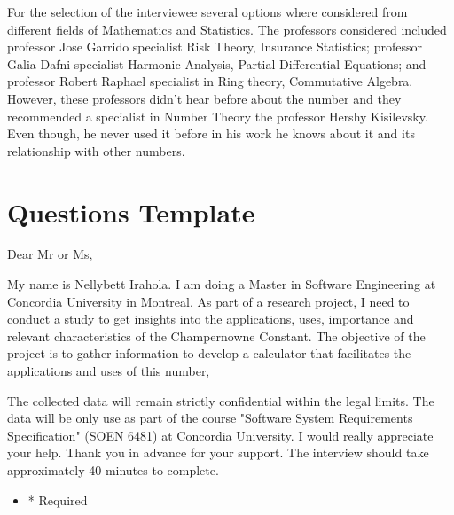 \documentclass{article}
\begin{document}
For the selection of the interviewee several options where considered from different fields of Mathematics and Statistics. The professors considered included professor Jose Garrido specialist Risk Theory, Insurance Statistics; professor Galia Dafni specialist Harmonic Analysis, Partial Differential Equations; and professor Robert Raphael specialist in Ring theory, Commutative Algebra. However, these professors didn’t hear before about the number and they recommended a specialist in Number Theory the professor Hershy Kisilevsky. Even though, he never used it before in his work he knows about it and its relationship with other numbers.


\section*{Questions Template} %

Dear Mr or Ms,

My name is Nellybett Irahola. I am doing a Master in Software Engineering at Concordia University in Montreal. As part of a research project, I need to conduct a study to get insights into the applications, uses, importance and relevant characteristics of the Champernowne Constant. The objective of the project is to gather information to develop a calculator that facilitates the applications and uses of this number,

The collected data will remain strictly confidential within the legal limits. The data will be only use as part of the course "Software System Requirements Specification" (SOEN 6481) at Concordia University. I would really appreciate your help. Thank you in advance for your support. The interview should take approximately 40 minutes to complete.
\begin{itemize}
\color{red}
\item * Required
\end{itemize}
\end{document}
